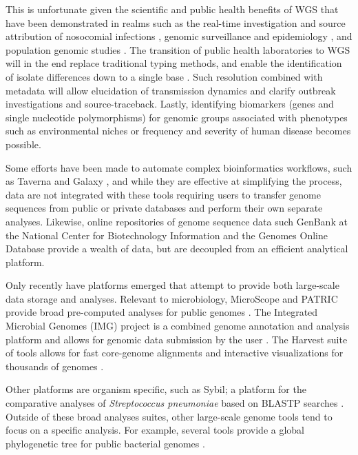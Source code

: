 \documentclass{bmcart}
\begin{document}
This is unfortunate given the scientific and public health benefits of WGS that have been demonstrated in realms such as  the real-time investigation and source attribution of nosocomial infections \cite{ halachev_genomic_2014, harris_whole-genome_2013,graham_real-time_2014}, genomic surveillance and epidemiology \cite{cody_real-time_2013}, and population genomic studies \cite{nasser_evolutionary_2014,kopac_genomic_2014}. The transition of public health laboratories to WGS will in the end replace traditional typing methods, and enable the identification of isolate differences down to a single base \cite{grad_epidemiologic_2014}. Such resolution combined with metadata will allow elucidation of transmission dynamics and clarify outbreak investigations and source-traceback. Lastly, identifying biomarkers (genes and single nucleotide polymorphisms) for genomic groups associated with phenotypes such as environmental niches or frequency and severity of human disease becomes possible.

Some efforts have been made to automate complex bioinformatics workflows, such as Taverna \cite{lanzen_taverna_2008} and Galaxy \cite{goecks_galaxy:_2010}, and while they are effective at simplifying the process, data are not integrated with these tools requiring users to transfer genome sequences from public or private databases and perform their own separate analyses. Likewise, online repositories of genome sequence data such GenBank at the National Center for Biotechnology Information \cite{benson_genbank_2012} and the Genomes Online Database \cite{pagani_genomes_2012} provide a wealth of data, but are decoupled from an efficient analytical platform.

Only recently have platforms emerged that attempt to provide both large-scale data storage and analyses. Relevant to microbiology, MicroScope and PATRIC provide broad pre-computed analyses for public genomes  \cite{vallenet_microscope--integrated_2012,wattam_patric_2013}. The Integrated Microbial Genomes (IMG) project is a combined genome annotation and analysis platform and allows for genomic data submission by the user \cite{markowitz_img_2013}. The Harvest suite of tools allows for fast core-genome alignments and interactive visualizations for thousands of genomes \cite{treangen_rapid_2014}.

Other platforms are organism specific, such as Sybil; a platform for the comparative analyses of \textit{Streptococcus pneumoniae} based on BLASTP searches \cite{riley_using_2012}. Outside of these broad analyses suites, other large-scale genome tools tend to focus on a specific analysis. For example, several tools provide a global phylogenetic tree for public bacterial genomes \cite{letunic_interactive_2011,fang_daily-updated_2013,federhen_ncbi_2011}.  
\end{document}
